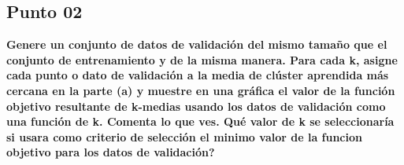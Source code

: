 \subsection*{Punto 02}

\textbf{Genere un conjunto de datos de validación del mismo tamaño que el conjunto de entrenamiento y de la misma manera. Para cada k, asigne cada punto o dato de validación a la media de clúster aprendida más cercana en la parte (a) y muestre en una gráfica el valor de la función objetivo resultante de k-medias usando los datos de validación como una función de k. Comenta lo que ves. Qué valor de k se seleccionaría si usara como criterio de selección el minimo valor de la funcion objetivo para los datos de validación?}